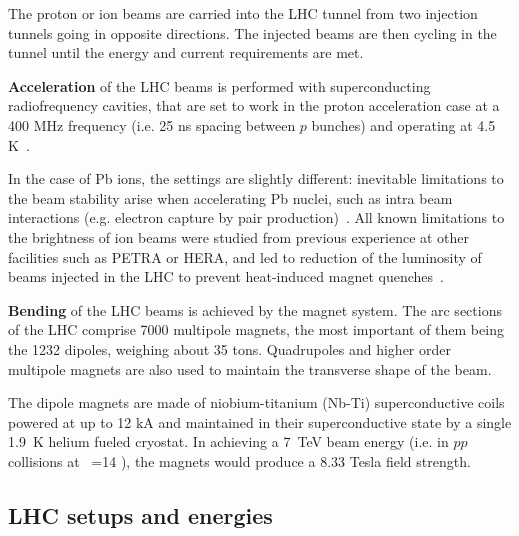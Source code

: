 The proton or ion beams are carried into the LHC tunnel from two
injection tunnels going in opposite directions. The injected beams are
then cycling in the tunnel until the energy and current requirements
are met.


\textbf{Acceleration} of the LHC beams is performed with superconducting
radiofrequency cavities, that are set to work in the proton
acceleration case at a 400 MHz frequency (i.e. 25 ns spacing between
$p$ bunches) and operating at 4.5 K~\cite{Arnaudon:2004kq}.

In the case of Pb ions, the settings are slightly different: inevitable limitations to the beam stability arise when accelerating Pb nuclei, such as
intra beam interactions (e.g. electron capture by pair production)~\cite{Beuret:2004mf}. All known limitations to the brightness
of ion beams were studied from previous experience at other facilities
such as PETRA or HERA, and led to reduction of the luminosity of beams
injected in the LHC to prevent heat-induced magnet quenches~\cite{jowett}.


\textbf{Bending} of the LHC beams is achieved by the magnet
system. The arc sections of the LHC comprise 7000
multipole magnets, the most important of them being the 1232
dipoles, weighing about 35 tons. Quadrupoles and higher order multipole magnets are also used
to maintain the transverse shape of the beam.%


The dipole magnets are made of niobium-titanium (Nb-Ti)
superconductive coils powered at up to 12 kA and maintained in their
superconductive state by a single 1.9~K helium fueled cryostat. In
achieving a 7~TeV beam energy (i.e. in $pp$ collisions at \s~=14 \TeV),
the magnets would produce a 8.33 Tesla field strength.







\subsection{LHC setups and energies}
\label{sec:lhcsetups}


